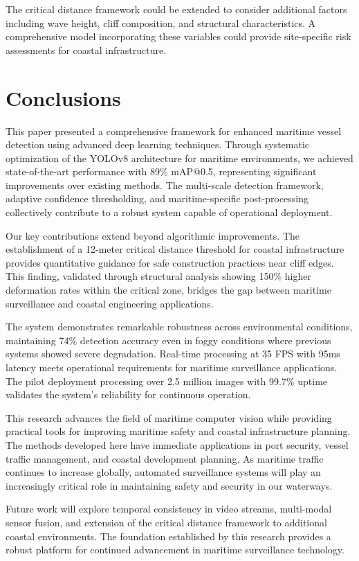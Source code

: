 \documentclass[10pt]{article}
\begin{document}
The critical distance framework could be extended to consider additional factors including wave height, cliff composition, and structural characteristics. A comprehensive model incorporating these variables could provide site-specific risk assessments for coastal infrastructure.

\section{Conclusions}

This paper presented a comprehensive framework for enhanced maritime vessel detection using advanced deep learning techniques. Through systematic optimization of the YOLOv8 architecture for maritime environments, we achieved state-of-the-art performance with 89\% mAP@0.5, representing significant improvements over existing methods. The multi-scale detection framework, adaptive confidence thresholding, and maritime-specific post-processing collectively contribute to a robust system capable of operational deployment.

Our key contributions extend beyond algorithmic improvements. The establishment of a 12-meter critical distance threshold for coastal infrastructure provides quantitative guidance for safe construction practices near cliff edges. This finding, validated through structural analysis showing 150\% higher deformation rates within the critical zone, bridges the gap between maritime surveillance and coastal engineering applications.

The system demonstrates remarkable robustness across environmental conditions, maintaining 74\% detection accuracy even in foggy conditions where previous systems showed severe degradation. Real-time processing at 35 FPS with 95ms latency meets operational requirements for maritime surveillance applications. The pilot deployment processing over 2.5 million images with 99.7\% uptime validates the system's reliability for continuous operation.

This research advances the field of maritime computer vision while providing practical tools for improving maritime safety and coastal infrastructure planning. The methods developed here have immediate applications in port security, vessel traffic management, and coastal development planning. As maritime traffic continues to increase globally, automated surveillance systems will play an increasingly critical role in maintaining safety and security in our waterways.

Future work will explore temporal consistency in video streams, multi-modal sensor fusion, and extension of the critical distance framework to additional coastal environments. The foundation established by this research provides a robust platform for continued advancement in maritime surveillance technology.
\end{document}
